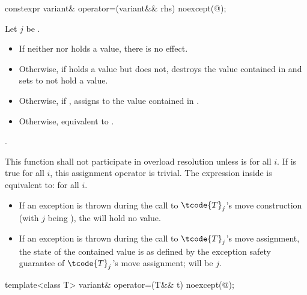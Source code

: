 %
\begin{itemdecl}
constexpr variant& operator=(variant&& rhs) noexcept(@\seebelow@);
\end{itemdecl}

\begin{itemdescr}
\pnum
Let $j$ be .

\pnum
\effects
\begin{itemize}
\item
If neither  nor  holds a value, there is no effect.
\item
Otherwise, if  holds a value but  does not, destroys the value
contained in  and sets  to not hold a value.
\item
Otherwise, if , assigns  to
the value contained in .
\item
Otherwise, equivalent to .
\end{itemize}

\pnum
\returns {}.

\pnum
\remarks
This function shall not participate in overload resolution unless
 is
 for all $i$.
If 
is true for all $i$, this assignment operator is trivial.
The expression inside  is equivalent to:
 for all $i$.
\begin{itemize}
\item If an exception is thrown during the call to $\tcode{T}_j$'s move construction
(with $j$ being ), the  will hold no value.
\item If an exception is thrown during the call to $\tcode{T}_j$'s move assignment,
the state of the contained value is as defined by the exception safety
guarantee of $\tcode{T}_j$'s move assignment;  will be $j$.
\end{itemize}
\end{itemdescr}

%
\begin{itemdecl}
template<class T> variant& operator=(T&& t) noexcept(@\seebelow@);
\end{itemdecl}

